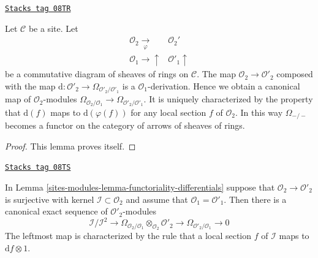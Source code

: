 \begin{lemma}
\label{sites-modules-lemma-functoriality-differentials}
\href{https://stacks.math.columbia.edu/tag/08TR}{\texttt{Stacks tag 08TR}}

Let $\mathcal{C}$ be a site. Let
$$
\begin{array}{cc}\mathcal{O}_2 \underset{\varphi}{\longrightarrow} & \mathcal{O}_2' \\ \mathcal{O}_1 \longrightarrow\uparrow & \mathcal{O}'_1 \uparrow\end{array}
$$
be a commutative diagram of sheaves of rings on $\mathcal{C}$. The map
$\mathcal{O}_2 \to \mathcal{O}'_2$ composed with the map
$\text{d} : \mathcal{O}'_2 \to \Omega_{\mathcal{O}'_2/\mathcal{O}'_1}$
is a $\mathcal{O}_1$-derivation. Hence we obtain a canonical map of
$\mathcal{O}_2$-modules
$\Omega_{\mathcal{O}_2/\mathcal{O}_1} \to
\Omega_{\mathcal{O}'_2/\mathcal{O}'_1}$.
It is uniquely characterized by the property that
$\text{d}(f)$ maps to $\text{d}(\varphi(f))$
for any local section $f$ of $\mathcal{O}_2$.
In this way $\Omega_{-/-}$ becomes a functor on the category
of arrows of sheaves of rings.
\end{lemma}

\begin{proof}
This lemma proves itself.
\end{proof}

\begin{lemma}
\label{sites-modules-lemma-differential-seq}
\href{https://stacks.math.columbia.edu/tag/08TS}{\texttt{Stacks tag 08TS}}

In Lemma \ref{sites-modules-lemma-functoriality-differentials} suppose that
$\mathcal{O}_2 \to \mathcal{O}'_2$ is surjective with kernel
$\mathcal{I} \subset \mathcal{O}_2$ and assume that
$\mathcal{O}_1 = \mathcal{O}'_1$. Then there is a canonical exact
sequence of $\mathcal{O}'_2$-modules
$$
\mathcal{I}/\mathcal{I}^2
\longrightarrow
\Omega_{\mathcal{O}_2/\mathcal{O}_1} \otimes_{\mathcal{O}_2} \mathcal{O}'_2
\longrightarrow
\Omega_{\mathcal{O}'_2/\mathcal{O}_1}
\longrightarrow
0
$$
The leftmost map is characterized by the rule that a local section
$f$ of $\mathcal{I}$ maps to $\text{d}f \otimes 1$.
\end{lemma}

